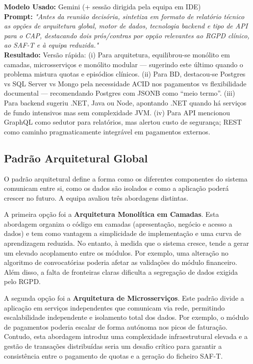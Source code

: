 \documentclass[a4paper,12pt]{scrreprt}
\newcommand{\caixaprompt}[3]{
    \begin{tcolorbox}[
        enhanced,
        colback=azulclaro,      %
        colframe=blue!50!black, %
        arc=2mm,                %
        boxrule=0.5mm,          %
        title=\textbf{Documentação de IA}, %
        fonttitle=\sffamily,
        coltitle=black,
        attach title to upper,
        after title={\par\medskip},
    ]
        \textbf{Modelo Usado:} #1 \\
        \textbf{Prompt:} \textit{"#2"} \\
        \tcbline %
        \textbf{Resultado:} #3
    \end{tcolorbox}
}
\begin{document}
{\caixaprompt{Gemini (+ sessão dirigida pela equipa em IDE)}{Antes da reunião decisória, sintetiza em formato de relatório técnico as opções de arquitetura global, motor de dados, tecnologia backend e tipo de API para o CAP, destacando dois prós/contras por opção relevantes ao RGPD clínico, ao SAF-T e à equipa reduzida.}{Versão rápida: (i) Para arquitetura, equilibrou-se monólito em camadas, microsserviços e monólito modular --- sugerindo este último quando o problema mistura quotas e episódios clínicos. (ii) Para BD, destacou‑se Postgres vs SQL Server vs Mongo pela necessidade ACID nos pagamentos vs flexibilidade documental --- recomendando Postgres com JSONB como ``meio termo''. (iii) Para backend sugeriu .NET, Java ou Node, apontando .NET quando há serviços de fundo intensivos mas sem complexidade JVM. (iv) Para API mencionou GraphQL como sedutor para relatórios, mas alertou custo de segurança; REST como caminho pragmaticamente integrável em pagamentos externos.}



\subsection{Padrão Arquitetural Global}

O padrão arquitetural define a forma como os diferentes componentes do sistema comunicam entre si, como os dados são isolados e como a aplicação poderá crescer no futuro. A equipa avaliou três abordagens distintas.

A primeira opção foi a \textbf{Arquitetura Monolítica em Camadas}. Esta abordagem organiza o código em camadas (apresentação, negócio e acesso a dados) e tem como vantagem a simplicidade de implementação e uma curva de aprendizagem reduzida. No entanto, à medida que o sistema cresce, tende a gerar um elevado acoplamento entre os módulos. Por exemplo, uma alteração no algoritmo de convocatórias poderia afetar as validações do módulo financeiro. Além disso, a falta de fronteiras claras dificulta a segregação de dados exigida pelo RGPD.

A segunda opção foi a \textbf{Arquitetura de Microsserviços}. Este padrão divide a aplicação em serviços independentes que comunicam via rede, permitindo escalabilidade independente e isolamento total dos dados. Por exemplo, o módulo de pagamentos poderia escalar de forma autónoma nos picos de faturação. Contudo, esta abordagem introduz uma complexidade infraestrutural elevada e a gestão de transações distribuídas seria um desafio crítico para garantir a consistência entre o pagamento de quotas e a geração do ficheiro SAF-T.

}
\end{document}
